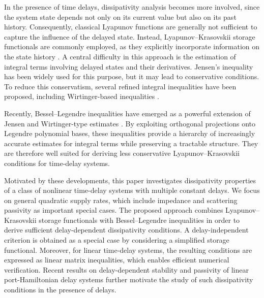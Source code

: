 \documentclass[12pt]{article}
\begin{document}
In the presence of time delays, dissipativity analysis becomes more involved, since the system state depends not only on its current value but also on its past history. Consequently, classical Lyapunov functions are generally not sufficient to capture the influence of the delayed state. Instead, Lyapunov--Krasovskii storage functionals are commonly employed, as they explicitly incorporate information on the state history \cite{Fridman2014}. A central difficulty in this approach is the estimation of integral terms involving delayed states and their derivatives. Jensen's inequality has been widely used for this purpose, but it may lead to conservative conditions. To reduce this conservatism, several refined integral inequalities have been proposed, including Wirtinger-based inequalities \cite{seuret2013jensen,seuret2013wirtinger}.

Recently, Bessel--Legendre inequalities have emerged as a powerful extension of Jensen and Wirtinger-type estimates \cite{seuret2015hierarchy}. By exploiting orthogonal projections onto Legendre polynomial bases, these inequalities provide a hierarchy of increasingly accurate estimates for integral terms while preserving a tractable structure. They are therefore well suited for deriving less conservative Lyapunov--Krasovskii conditions for time-delay systems.

Motivated by these developments, this paper investigates dissipativity properties of a class of nonlinear time-delay systems with multiple constant delays. We focus on general quadratic supply rates, which include impedance and scattering passivity as important special cases. The proposed approach combines Lyapunov--Krasovskii storage functionals with Bessel--Legendre inequalities in order to derive sufficient delay-dependent dissipativity conditions. A delay-independent criterion is obtained as a special case by considering a simplified storage functional. Moreover, for linear time-delay systems, the resulting conditions are expressed as linear matrix inequalities, which enables efficient numerical verification. Recent results on delay-dependent stability and passivity of linear port-Hamiltonian delay systems \cite{haskouki2026delaydependentpassivitystabilitylinear} further motivate the study of such dissipativity conditions in the presence of delays.
\end{document}
